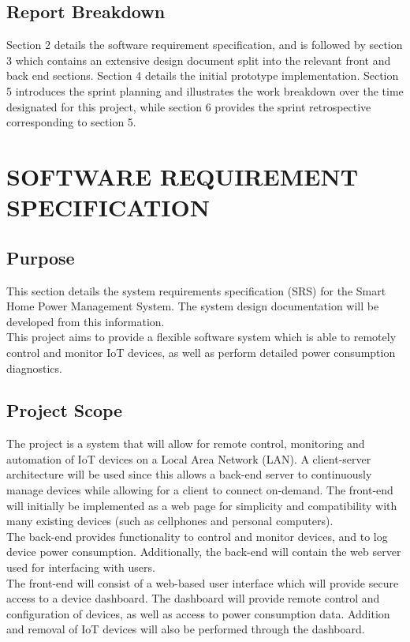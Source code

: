 \documentclass[10pt,twocolumn]{witseiepaper}
\begin{document}
	\subsection{Report Breakdown}
	Section 2 details the software requirement specification, and is followed by section 3 which contains an extensive design document split into the relevant front and back end sections. Section 4 details the initial prototype implementation. Section 5 introduces the sprint planning and illustrates the work breakdown over the time designated for this project, while section 6 provides the sprint retrospective corresponding to section 5. 
	\section{SOFTWARE REQUIREMENT SPECIFICATION}
	
	\subsection{Purpose}
	This section details the system requirements specification (SRS) for the Smart Home Power Management System. The system design documentation will be developed from this information.\\
	
	This project aims to provide a flexible software system which is able to remotely control and monitor IoT devices, as well as perform detailed power consumption diagnostics.
	
	\subsection{Project Scope}
	The project is a system that will allow for remote control, monitoring and automation of IoT devices on a Local Area Network (LAN). A client-server architecture will be used since this allows a back-end server to continuously manage devices while allowing for a client to connect on-demand. The front-end will initially be implemented as a web page for simplicity and compatibility with many existing devices (such as cellphones and personal computers). \\
	\newline 
	The back-end provides functionality to control and monitor devices, and to log device power consumption. Additionally, the back-end will contain the web server used for interfacing with users. \\
	\newline
	The front-end will consist of a web-based user interface which will provide secure access to a device dashboard. The dashboard will provide remote control and configuration of devices, as well as access to power consumption data. Addition and removal of IoT devices will also be performed through the dashboard. 
	
\end{document}
